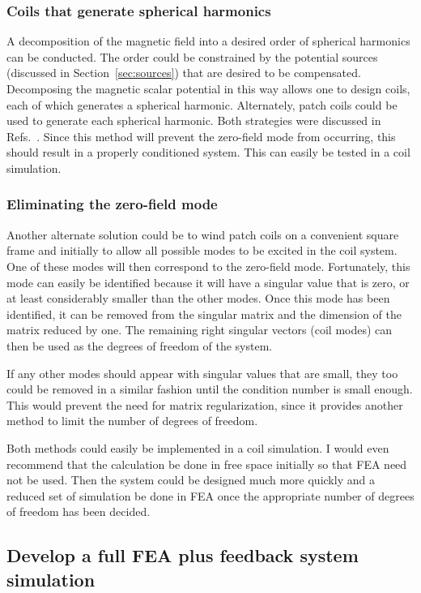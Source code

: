 \subsubsection{Coils that generate spherical harmonics}

A decomposition of the magnetic field into a desired order of spherical harmonics can be conducted. The order could be constrained by the potential sources (discussed in Section~\ref{sec:sources}) that are desired to be compensated.  Decomposing the magnetic scalar potential in this way allows one to design coils, each of which generates a spherical harmonic.  Alternately, patch coils could be used to generate each spherical harmonic. Both strategies were discussed in Refs.~\cite{rawlik,rawlik_paper_coil}. Since this method will prevent the zero-field mode from occurring, this should result in a properly conditioned system.  This can easily be tested in a coil simulation.

\subsubsection{Eliminating the zero-field mode}

Another alternate solution could be to wind patch coils on a convenient square frame and initially to allow all possible modes to be excited in the coil system.  One of these modes will then correspond to the zero-field mode.  Fortunately, this mode can easily be identified because it will have a singular value that is zero, or at least considerably smaller than the other modes.  Once this mode has been identified, it can be removed from the singular matrix and the dimension of the matrix reduced by one.  The remaining right singular vectors (coil modes) can then be used as the degrees of freedom of the system.

If any other modes should appear with singular values that are small, they too could be removed in a similar fashion until the condition number is small enough.  This would prevent the need for matrix regularization, since it provides another method to limit the number of degrees of freedom.

Both methods could easily be implemented in a coil simulation. I would even recommend that the calculation be done in free space initially so that FEA need not be used. Then the system could be designed much more quickly and a reduced set of simulation be done in FEA once the appropriate number of degrees of freedom has been decided.

\subsection{Develop a full FEA plus feedback system simulation}


